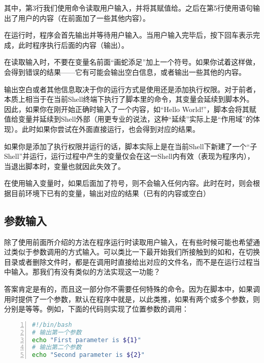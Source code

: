 其中，第3行我们使用命令读取用户输入，并将其赋值给。之后在第5行使用语句输出了用户的内容（在前面加了一些其他内容）。

在运行时，程序会首先输出并等待用户输入。当用户输入完毕后，按下回车表示完成，此时程序执行后面的内容（输出）。

\begin{attention}
    在读取输入时，不要在变量名前面“画蛇添足”加上一个\code{\$}符号。如果你试着这样做，会得到错误的结果——它有可能会输出空白信息，或者输出一些其他的内容。
\end{attention}

\begin{extend}
    输出空白或者其他信息取决于你的运行方式是使用还是添加执行权限。对于前者，本质上相当于在当前Shell终端下执行了脚本里的命令，其变量会延续到脚本外。因此，如果你在刚开始正确时输入了一个内容，如“Hello World!”，脚本会将其赋值给变量并延续到Shell外部（用更专业的说法，这种“延续”实际上是“作用域”的体现）。此时如果你尝试在外面直接运行，也会得到对应的结果。

    如果你是添加了执行权限并运行的话，脚本实际上是在当前Shell下新建了一个“子Shell”并运行，运行过程中产生的变量仅会在这一Shell内有效（表现为程序内），当退出脚本时，变量也就因此失效了。

    在使用输入变量时，如果后面加了\code{\$}符号，则不会输入任何内容。此时在时，则会根据目前环境下已有的变量，输出对应的结果（已有的内容或空白）
\end{extend}

\subsection{参数输入}\label{subsec:输入-参数输入}

除了使用前面所介绍的方法在程序运行时读取用户输入，在有些时候可能也希望通过类似于参数调用的方式输入。可以类比一下最开始我们所接触到的如和，在切换目录或者删除文件时，都是在调用时直接给出对应的文件名，而不是在运行过程当中输入。那我们有没有类似的方法实现这一功能？

答案肯定是有的，而且这一部分你不需要任何特殊的命令。因为在脚本中，如果调用时提供了一个参数，默认在程序中就是，以此类推，如果有两个或多个参数，则分别是等等。例如，下面的代码则实现了位置参数的调用：

\begin{lstlisting}[language=bash,caption=loc\_parameters,numbers=left]
#!/bin/bash
# 输出第一个参数
echo "First parameter is ${1}"
# 输出第二个参数
echo "Second parameter is ${2}"
\end{lstlisting}


